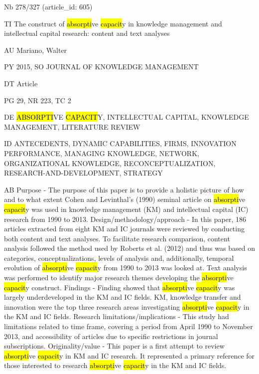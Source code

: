 \documentclass[a4paper]{article}
\begin{document}
\vspace*{-2cm}
Nb \tabto{0cm}278/327 (article\_id: 605)\par
TI \tabto{0cm}The construct of \hl{absorpti}ve \hl{capacit}y in knowledge management and intellectual capital research: content and text analyses\par
AU \tabto{0cm}Mariano, Walter\par
PY \tabto{0cm}2015, SO JOURNAL OF KNOWLEDGE MANAGEMENT\par
DT \tabto{0cm}Article\par
PG \tabto{0cm}29, NR 223, TC 2\par
DE \tabto{0cm}\hl{ABSORPTI}VE \hl{CAPACIT}Y, INTELLECTUAL CAPITAL, KNOWLEDGE MANAGEMENT, LITERATURE REVIEW\par
ID \tabto{0cm}ANTECEDENTS, DYNAMIC CAPABILITIES, FIRMS, INNOVATION PERFORMANCE, MANAGING KNOWLEDGE, NETWORK, ORGANIZATIONAL KNOWLEDGE, RECONCEPTUALIZATION, RESEARCH-AND-DEVELOPMENT, STRATEGY\par
AB \tabto{0cm}Purpose - The purpose of this paper is to provide a holistic picture of how and to what extent Cohen and Levinthal's (1990) seminal article on \hl{absorpti}ve \hl{capacit}y was used in knowledge management (KM) and intellectual capital (IC) research from 1990 to 2013.
Design/methodology/approach - In this paper, 186 articles extracted from eight KM and IC journals were reviewed by conducting both content and text analyses. To facilitate research comparison, content analysis followed the method used by Roberts et al. (2012) and thus was based on categories, conceptualizations, levels of analysis and, additionally, temporal evolution of \hl{absorpti}ve \hl{capacit}y from 1990 to 2013 was looked at. Text analysis was performed to identify major research themes developing the \hl{absorpti}ve \hl{capacit}y construct.
Findings - Finding showed that \hl{absorpti}ve \hl{capacit}y was largely underdeveloped in the KM and IC fields. KM, knowledge transfer and innovation were the top three research areas investigating \hl{absorpti}ve \hl{capacit}y in the KM and IC fields. Research limitations/implications - This study had limitations related to time frame, covering a period from April 1990 to November 2013, and accessibility of articles due to specific restrictions in journal subscriptions.
Originality/value - This paper is a first attempt to review \hl{absorpti}ve \hl{capacit}y in KM and IC research. It represented a primary reference for those interested to research \hl{absorpti}ve \hl{capacit}y in the KM and IC fields.\par
\clearpage
\end{document}
